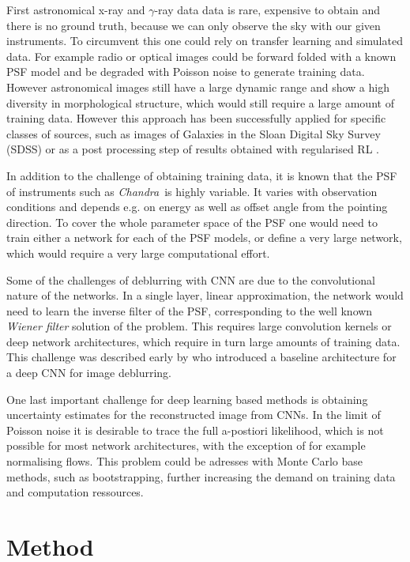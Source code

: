 \documentclass[twocolumn]{aastex631}
\newcommand{\chandra}{\textit{Chandra}~}
\newcommand{\gammaray}{$\gamma$-ray\xspace}
\begin{document}
    First astronomical x-ray and \gammaray data data is rare, expensive to obtain and there is no ground truth, because we can only observe the sky with our given instruments. To circumvent this one could rely on transfer learning and simulated data. For example radio or optical images could be forward folded with a known PSF model and be degraded with Poisson noise to generate training data. However astronomical images still have a large dynamic range and show a high diversity in morphological structure, which would still require a large amount of training data. However this approach has been successfully applied for specific classes of sources, such as images of Galaxies in the Sloan Digital Sky Survey (SDSS) \citep{Schawinski2017} or as a post processing step of results obtained with regularised RL \citep{Akhaury2022}.

    In addition to the challenge of obtaining training data, it is known that the PSF of instruments such as \chandra is highly variable. It varies with observation conditions and depends e.g. on energy as well as offset angle from the pointing direction. To cover the whole parameter space of the PSF one would need to train either a network for each of the PSF models, or define a very large network, which would require a very large computational effort.

    Some of the challenges of deblurring with CNN are due to the convolutional nature of the networks. In a single layer, linear approximation, the network would need to learn the inverse filter of the PSF, corresponding to the well known \textit{Wiener filter} solution of the problem. This requires large convolution kernels or deep network architectures, which require in turn large amounts of training data. This challenge was described early by \cite{Li2014} who introduced a baseline architecture for a deep CNN for image deblurring.
    
    One last important challenge for deep learning based methods is obtaining uncertainty estimates for the reconstructed image from CNNs. In the limit of Poisson noise it is desirable to trace the full a-postiori likelihood, which is not possible for most network architectures, with the exception of for example normalising flows.
    This problem could be adresses with Monte Carlo base methods, such as bootstrapping, further increasing the demand on training data and computation ressources.

    \section{Method}
\end{document}

